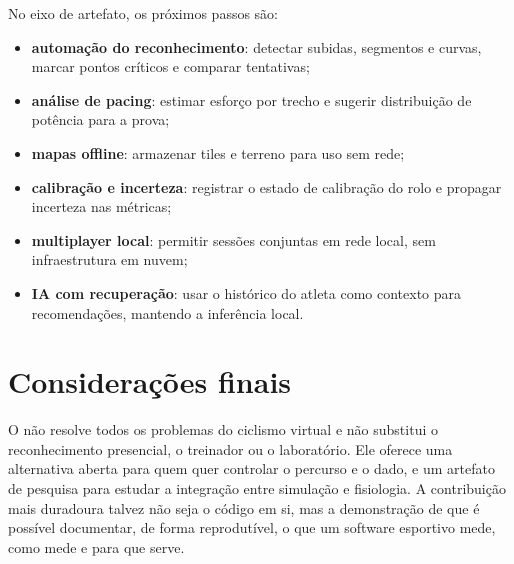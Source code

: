 No eixo de artefato, os próximos passos são:

\begin{itemize}
    \item \textbf{automação do reconhecimento}: detectar subidas, segmentos e
        curvas, marcar pontos críticos e comparar tentativas;
    \item \textbf{análise de pacing}: estimar esforço por trecho e sugerir
        distribuição de potência para a prova;
    \item \textbf{mapas offline}: armazenar tiles e terreno para uso sem rede;
    \item \textbf{calibração e incerteza}: registrar o estado de calibração do
        rolo e propagar incerteza nas métricas;
    \item \textbf{multiplayer local}: permitir sessões conjuntas em rede local,
        sem infraestrutura em nuvem;
    \item \textbf{IA com recuperação}: usar o histórico do atleta como contexto
        para recomendações, mantendo a inferência local.
\end{itemize}

\section{Considerações finais}
\label{sec:consideracoes-finais}

O \argus{} não resolve todos os problemas do ciclismo virtual e não substitui o
reconhecimento presencial, o treinador ou o laboratório. Ele oferece uma
alternativa aberta para quem quer controlar o percurso e o dado, e um artefato
de pesquisa para estudar a integração entre simulação e fisiologia. A
contribuição mais duradoura talvez não seja o código em si, mas a demonstração
de que é possível documentar, de forma reprodutível, o que um software esportivo
mede, como mede e para que serve.
